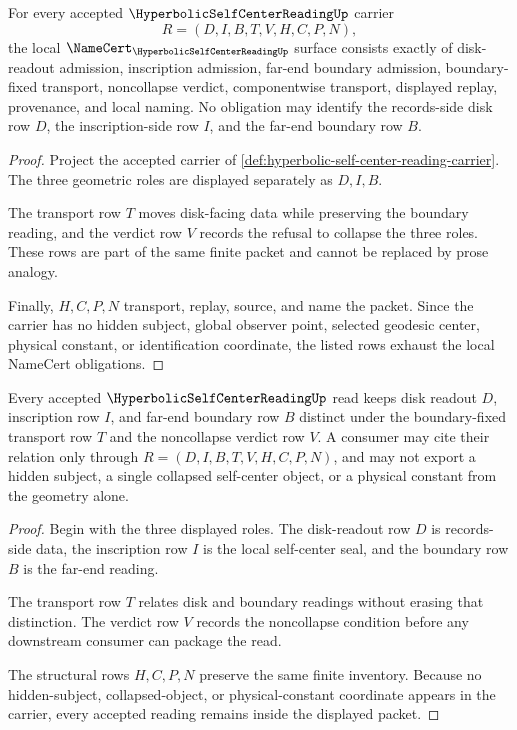 \begin{theorem}
\label{thm:hyperbolic-self-center-reading-namecert-obligations}
For every accepted $\HyperbolicSelfCenterReadingUp$ carrier
$$
R=(D,I,B,T,V,H,C,P,N),
$$
the local $\NameCert_{\HyperbolicSelfCenterReadingUp}$ surface consists exactly of disk-readout admission, inscription admission, far-end boundary admission, boundary-fixed transport, noncollapse verdict, componentwise transport, displayed replay, provenance, and local naming. No obligation may identify the records-side disk row $D$, the inscription-side row $I$, and the far-end boundary row $B$.
\end{theorem}
\begin{proof}
Project the accepted carrier of \autoref{def:hyperbolic-self-center-reading-carrier}. The three geometric roles are displayed separately as $D,I,B$.

The transport row $T$ moves disk-facing data while preserving the boundary reading, and the verdict row $V$ records the refusal to collapse the three roles. These rows are part of the same finite packet and cannot be replaced by prose analogy.

Finally, $H,C,P,N$ transport, replay, source, and name the packet. Since the carrier has no hidden subject, global observer point, selected geodesic center, physical constant, or identification coordinate, the listed rows exhaust the local NameCert obligations.
\end{proof}

\begin{theorem}
\label{thm:hyperbolic-self-center-reading-noncollapse}
Every accepted $\HyperbolicSelfCenterReadingUp$ read keeps disk readout $D$, inscription row $I$, and far-end boundary row $B$ distinct under the boundary-fixed transport row $T$ and the noncollapse verdict row $V$. A consumer may cite their relation only through $R=(D,I,B,T,V,H,C,P,N)$, and may not export a hidden subject, a single collapsed self-center object, or a physical constant from the geometry alone.
\end{theorem}
\begin{proof}
Begin with the three displayed roles. The disk-readout row $D$ is records-side data, the inscription row $I$ is the local self-center seal, and the boundary row $B$ is the far-end reading.

The transport row $T$ relates disk and boundary readings without erasing that distinction. The verdict row $V$ records the noncollapse condition before any downstream consumer can package the read.

The structural rows $H,C,P,N$ preserve the same finite inventory. Because no hidden-subject, collapsed-object, or physical-constant coordinate appears in the carrier, every accepted reading remains inside the displayed packet.
\end{proof}

